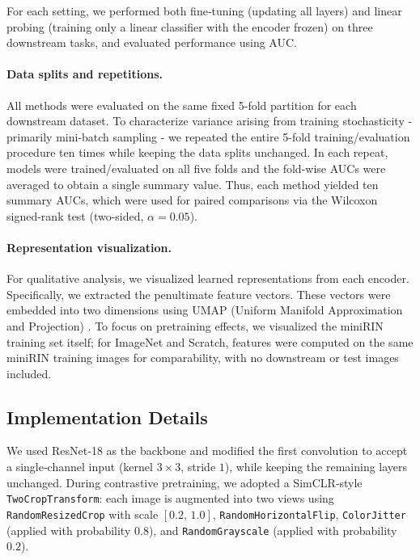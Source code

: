 \documentclass[final,1p,times]{elsarticle}
\begin{document}
For each setting, we performed both fine‑tuning (updating all layers) and linear probing (training only a linear classifier with the encoder frozen) on three downstream tasks, and evaluated performance using AUC.
\paragraph{Data splits and repetitions.}
All methods were evaluated on the same fixed 5-fold partition for each downstream dataset. To characterize variance arising from training stochasticity - primarily mini-batch sampling - we repeated the entire 5-fold training/evaluation procedure ten times while keeping the data splits unchanged. In each repeat, models were trained/evaluated on all five folds and the fold-wise AUCs were averaged to obtain a single summary value. Thus, each method yielded ten summary AUCs, which were used for paired comparisons via the Wilcoxon signed-rank test (two-sided, $\alpha=0.05$).

\paragraph{Representation visualization.}
For qualitative analysis, we visualized learned representations from each encoder. Specifically, we extracted the penultimate feature vectors. These vectors were embedded into two dimensions using UMAP (Uniform Manifold Approximation and Projection) \cite{mcinnes2018umap}. To focus on pretraining effects, we visualized the miniRIN training set itself; for ImageNet and Scratch, features were computed on the same miniRIN training images for comparability, with no downstream or test images included.
%


\subsection{Implementation Details}
We used ResNet‑18 as the backbone and modified the first convolution to accept a single‑channel input (kernel $3{\times}3$, stride $1$), while keeping the remaining layers unchanged. During contrastive pretraining, we adopted a SimCLR‑style \texttt{TwoCropTransform}: each image is augmented into two views using \texttt{RandomResizedCrop} with scale $[0.2,\,1.0]$, \texttt{RandomHorizontalFlip}, \texttt{ColorJitter} (applied with probability $0.8$), and \texttt{RandomGrayscale} (applied with probability $0.2$).
\end{document}
